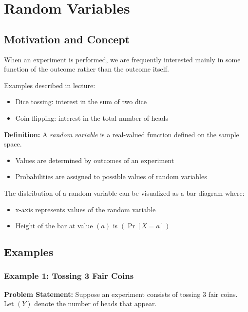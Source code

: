 \documentclass[12pt]{article}
\begin{document}
\section{Random Variables}

\subsection{Motivation and Concept}

When an experiment is performed, we are frequently interested mainly in some function of the outcome rather than the outcome itself.

Examples described in lecture:
\begin{itemize}
    \item Dice tossing: interest in the sum of two dice
    \item Coin flipping: interest in the total number of heads
\end{itemize}

\textbf{Definition:}  
A \textit{random variable} is a real-valued function defined on the sample space.

\begin{itemize}
    \item Values are determined by outcomes of an experiment
    \item Probabilities are assigned to possible values of random variables
\end{itemize}

The distribution of a random variable can be visualized as a bar diagram where:
\begin{itemize}
    \item x-axis represents values of the random variable
    \item Height of the bar at value $( a )$ is $( \Pr[X = a] )$
\end{itemize}

\subsection{Examples}

\subsubsection{Example 1: Tossing 3 Fair Coins}

\textbf{Problem Statement:}  
Suppose an experiment consists of tossing 3 fair coins. Let $( Y )$ denote the number of heads that appear.
\end{document}
